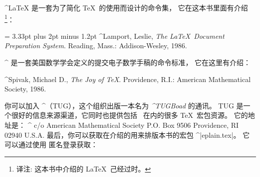 {{%
^{\LaTeX} 是一套为了简化 \TeX\ 的使用而设计的命令集，
它在这本书里面有介绍\footnote{译注: 这本书中介绍的 \LaTeX\ 己经过时。}：
\smallskip
{\narrower\noindent\frenchspacing\spaceskip = 3.33pt plus 2pt minus 1.2pt
^{Lamport, Leslie}, {\sl The \LaTeX\ Document Preparation System}.
Reading, Mass.: Addison-Wesley, 1986.\par}
\smallskip
\noindent
^{\AMSTeX} 是一套美国数学学会定义的提交电子数学手稿的命令标准，
它在这里有介绍：
\smallskip
{\narrower\noindent
^{Spivak, Michael D.}, {\sl The Joy of \TeX}. Providence, R.I.:
American Mathematical Society, 1986.
\par}
\smallskip
\noindent
你可以加入 ^{\TUG}（TUG），这个组织出版一本名为 {\it ^{TUGBoad}} 的通讯。
TUG 是一个很好的信息来源渠道，它同时也提供包括 \AMSTeX\ 在内的很多 \TeX\ 宏包资源。
它的地址是：
\smallskip
{\obeylines
^{\TUG}
c/o American Mathematical Society
P.O. Box 9506
Providence,  RI  02940
U.S.A.
}
\smallskip
\noindent
最后，你可以获取在介绍的用来排版本书的宏包 ^|eplain.tex|。
它可以通过使用 \ftp 匿名登录获取：
{\obeylines{}}

}}
